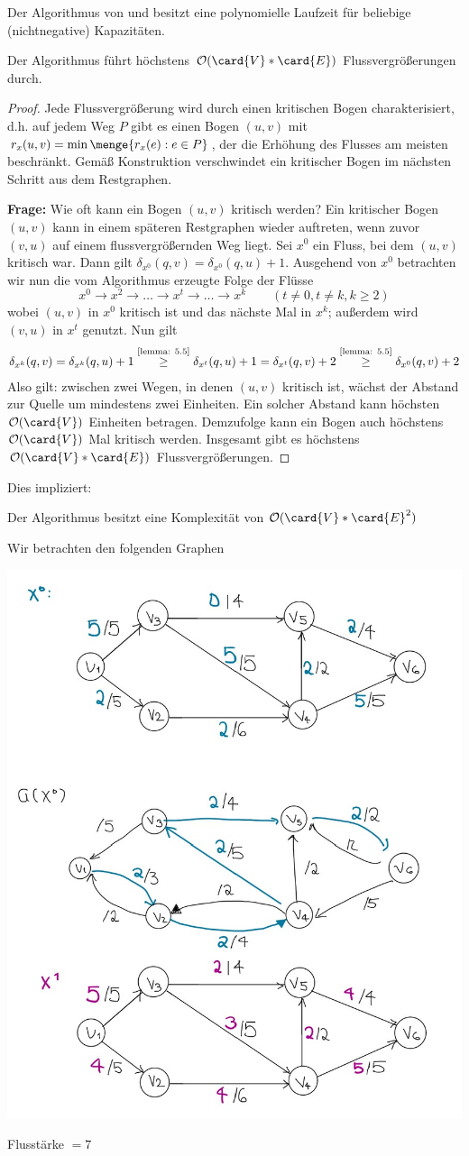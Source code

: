 Der Algorithmus von  und  besitzt eine polynomielle Laufzeit für beliebige (nichtnegative) Kapazitäten.

\begin{lemma}
	Der Algorithmus führt höchstens $\mathcal{O}(\card{V} * \card{E})$ Flussvergrößerungen durch.
\end{lemma}
\begin{proof}
	Jede Flussvergrößerung wird durch einen kritischen Bogen charakterisiert, d.h. auf jedem Weg $P$ gibt es einen Bogen $(u,v)$ mit $r_x(u,v) = \min\menge{r_x(e) : e \in P}$, der die Erhöhung des Flusses am meisten beschränkt. Gemäß Konstruktion verschwindet ein kritischer Bogen im nächsten Schritt aus dem Restgraphen. 
	
	\textbf{Frage:} Wie oft kann ein Bogen $(u,v)$ kritisch werden?  
	Ein kritischer Bogen $(u,v)$ kann in einem späteren Restgraphen wieder auftreten, wenn zuvor $(v,u)$ auf einem flussvergrößernden Weg liegt. Sei $x^0$ ein Fluss, bei dem $(u,v)$ kritisch war. Dann gilt $\delta_{x^0}(q,v) = \delta_{x^0}(q,u) + 1$. Ausgehend von $x^0$ betrachten wir nun die vom Algorithmus erzeugte Folge der Flüsse
	\begin{equation*}
		x^0 \to x^2 \to \dots \to x^t \to \dots \to x^k \qquad (t \neq 0, t \neq k, k \ge 2)
	\end{equation*}
	wobei $(u,v)$ in $x^0$ kritisch ist und das nächste Mal in $x^k$; außerdem wird $(v,u)$ in $x^t$ genutzt. Nun gilt
	\begin{equation*}
		\begin{aligned}
		\delta_{x^k}(q,v) = \delta_{x^k}(q,u) + 1 \overset{\text{\cref{lemma: 5.5}}}{\ge} \delta_{x^t}(q,u) + 1 = \delta_{x^t}(q,v) + 2 \overset{\text{\cref{lemma: 5.5}}}{\ge} \delta_{x^0}(q,v) + 2 
		\end{aligned}
	\end{equation*}
	Also gilt: zwischen zwei Wegen, in denen $(u,v)$ kritisch ist, wächst der Abstand zur Quelle um mindestens zwei Einheiten. Ein solcher Abstand kann höchsten $\mathcal{O}(\card{V})$ Einheiten betragen. Demzufolge kann ein Bogen auch höchstens $\mathcal{O}(\card{V})$ Mal kritisch werden. Insgesamt gibt es höchstens $\mathcal{O}(\card{V} * \card{E})$ Flussvergrößerungen.
\end{proof}

Dies impliziert:
\begin{aussage}
	Der Algorithmus besitzt eine Komplexität von $\mathcal{O}(\card{V} * \card{E}^2)$
\end{aussage}

\begin{beispiel}
Wir betrachten den folgenden Graphen

	\includegraphics[width=.3\linewidth]{./optinum_abb/optinum_5_4_bsp5-5.jpg}

Flusstärke $= 7$
\end{beispiel}